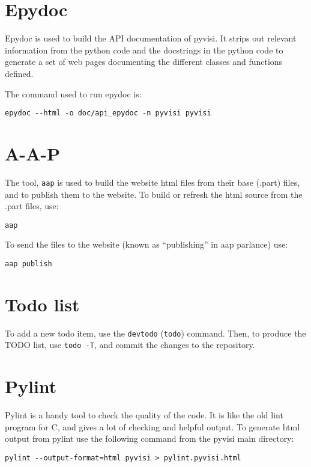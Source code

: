 \documentclass[12pt,a4paper]{article}
\begin{document}
\section{Epydoc}

Epydoc is used to build the API documentation of pyvisi.  It strips out
relevant information from the python code and the docstrings in the python
code to generate a set of web pages documenting the different classes and
functions defined.

The command used to run epydoc is:
\begin{verbatim}
epydoc --html -o doc/api_epydoc -n pyvisi pyvisi
\end{verbatim}

\section{A-A-P}

The tool, \texttt{aap} is used to build the website html files from their base
(.part) files, and to publish them to the website.  To build or refresh the
html source from the .part files, use:
\begin{verbatim}
aap
\end{verbatim}
To send the files to the website (known as ``publishing'' in aap parlance)
use:
\begin{verbatim}
aap publish
\end{verbatim}

\section{Todo list}

To add a new todo item, use the \texttt{devtodo} (\texttt{todo}) command.
Then, to produce the TODO list, use \texttt{todo -T}, and commit the changes
to the repository.

\section{Pylint}

Pylint is a handy tool to check the quality of the code.  It is like the old
lint program for C, and gives a lot of checking and helpful output.  To
generate html output from pylint use the following command from the pyvisi
main directory:
\begin{verbatim}
pylint --output-format=html pyvisi > pylint.pyvisi.html
\end{verbatim}
\end{document}
